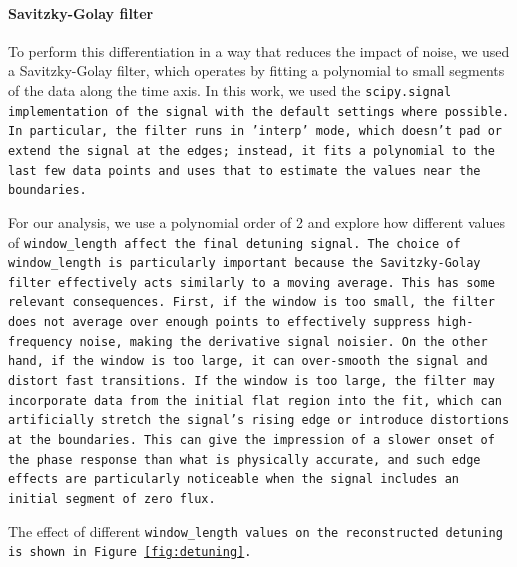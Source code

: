 \paragraph{Savitzky-Golay filter}
To perform this differentiation in a way that reduces the impact of noise, we used a Savitzky-Golay filter, which operates by fitting a polynomial to small segments of the data along the time axis. In this work, we used the \tt{scipy.signal} implementation of the signal with the default settings where possible. 
In particular, the filter runs in \tt{'interp'} mode, which doesn't pad or extend the signal at the edges; instead, it fits a polynomial to the last few data points and uses that to estimate the values near the boundaries.

For our analysis, we use a polynomial order of 2 and explore how different values of \tt{window\_length} affect the final detuning signal. 
The choice of \tt{window\_length} is particularly important because the Savitzky-Golay filter effectively acts similarly to a moving average. 
This has some relevant consequences. First, if the window is too small, the filter does not average over enough points to effectively suppress high-frequency noise, making the derivative signal noisier. 
On the other hand, if the window is too large, it can over-smooth the signal and distort fast transitions. 
If the window is too large, the filter may incorporate data from the initial flat region into the fit, which can artificially stretch the signal's rising edge or introduce distortions at the boundaries. 
This can give the impression of a slower onset of the phase response than what is physically accurate, and such edge effects are particularly noticeable when the signal includes an initial segment of zero flux.

The effect of different \tt{window\_length} values on the reconstructed detuning is shown in Figure \ref{fig:detuning}.

